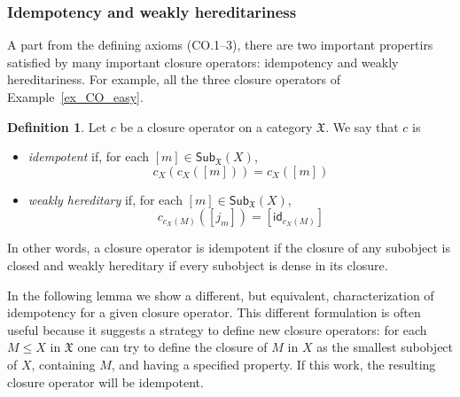 \documentclass[12pt]{article}
\theoremstyle{definition}
\newtheorem{definition}[lemma]{Definition}
\def\X{\mathfrak X}
\numberwithin{equation}{section}
\newcommand{\catname}[1]{\mathbf{#1}}
\newcommand{\sub}[1]{\mathsf{Sub}_{\catname{#1}}}
\newcommand{\id}[1]{\mathsf{id}_{#1}}
\begin{document}
\subsubsection{Idempotency and weakly hereditariness}
A part from the defining axioms (CO.1--3), there are two important propertirs satisfied by many important closure operators: idempotency and weakly hereditariness. For example, all the three closure operators of Example~\ref{ex_CO_easy}. 

\begin{definition}
	Let $c$ be a closure operator on a category $\X$. We say that $c$ is
	\begin{itemize}
		\item \emph{idempotent} if, for each $[m]\in \sub{\X}(X)$,
		\begin{equation*}
		c_X(c_X([m]))= c_X([m])
		\end{equation*} 
		\item \emph{weakly hereditary} if, for each $[m]\in \sub{\X}(X)$,
		\begin{equation*}
			c_{c_X(M)}([j_m])=[\id{c_X(M)}]
		\end{equation*}		
	\end{itemize} 
In other words, a closure operator is idempotent if the closure of any subobject is closed and weakly hereditary if every subobject is dense in its closure.
\end{definition}

In the following lemma we show a different, but equivalent, characterization of idempotency for a given closure operator. This different formulation is often useful because it suggests a strategy to define new closure operators: for each $M\leq X$ in $\X$ one can try to define the closure of $M$ in $X$ as the smallest subobject of $X$, containing $M$, and having a specified property. If this work, the resulting closure operator will be idempotent.
\end{document}
